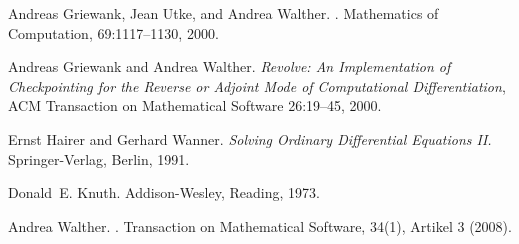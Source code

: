 \documentclass[11pt,twoside]{article}
\begin{document}
\begin{thebibliography}{10}
Andreas Griewank, Jean Utke, and Andrea Walther.
.
\newblock Mathematics of Computation, 69:1117--1130, 2000.

Andreas Griewank and Andrea Walther. {\em Revolve: An Implementation of Checkpointing for the Reverse
                 or Adjoint Mode of Computational Differentiation},
		 ACM Transaction on Mathematical Software 26:19--45, 2000.

    Ernst Hairer and Gerhard Wanner.
    {\it Solving Ordinary Differential Equations II.\/}
    Springer-Verlag, Berlin, 1991.

Donald~E. Knuth.
\newblock Addison-Wesley, Reading, 1973.

Andrea Walther.
.
\newblock Transaction on Mathematical Software, 34(1), Artikel 3 (2008).
\end{thebibliography}
\end{document}
